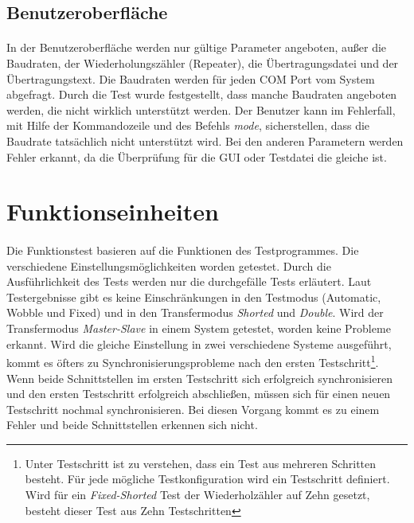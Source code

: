 \subsection{Benutzeroberfläche}
\paragraph{}
In der Benutzeroberfläche werden nur gültige Parameter angeboten, außer die Baudraten, der Wiederholungszähler (Repeater), die Übertragungsdatei und der Übertragungstext. Die Baudraten werden für jeden COM Port vom System abgefragt. Durch die Test wurde festgestellt, dass manche Baudraten angeboten werden, die nicht wirklich unterstützt werden. Der Benutzer kann im Fehlerfall, mit Hilfe der Kommandozeile und des Befehls \textit{mode}, sicherstellen, dass die Baudrate tatsächlich nicht unterstützt wird. Bei den anderen Parametern werden Fehler erkannt, da die Überprüfung für die GUI oder Testdatei die gleiche ist.



\section{Funktionseinheiten}
\paragraph{}
Die Funktionstest basieren auf die Funktionen des Testprogrammes. Die verschiedene Einstellungsmöglichkeiten worden getestet. Durch die Ausführlichkeit des Tests werden nur die durchgefälle Tests erläutert. Laut Testergebnisse gibt es keine Einschränkungen in den Testmodus (Automatic, Wobble und Fixed) und in den Transfermodus \textit{Shorted} und \textit{Double}. Wird der Transfermodus \textit{Master-Slave} in einem System getestet, worden keine Probleme erkannt. Wird die gleiche Einstellung in zwei verschiedene Systeme ausgeführt, kommt es öfters zu Synchronisierungsprobleme nach den ersten Testschritt\footnote{Unter Testschritt ist zu verstehen, dass ein Test aus mehreren Schritten besteht. Für jede mögliche Testkonfiguration wird ein Testschritt definiert. Wird für ein \textit{Fixed-Shorted} Test der Wiederholzähler auf Zehn gesetzt, besteht dieser Test aus Zehn Testschritten}. Wenn beide Schnittstellen im ersten Testschritt sich erfolgreich synchronisieren und den ersten Testschritt erfolgreich abschließen, müssen sich für einen neuen Testschritt nochmal synchronisieren. Bei diesen Vorgang kommt es zu einem Fehler und beide Schnittstellen erkennen sich nicht.